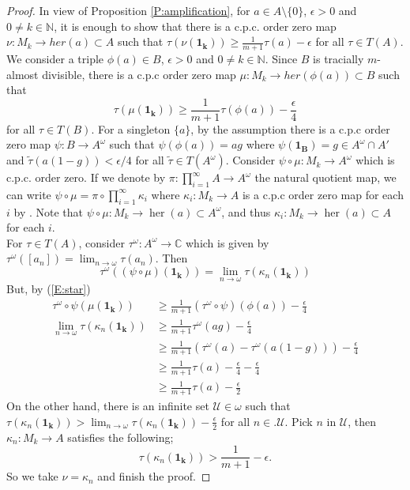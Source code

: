 \documentclass[12pt]{amsart}
\theoremstyle{plain}
\theoremstyle{definition}
\def\her{\operatorname{her}}
\newcommand{\mc}{\mathcal}
\numberwithin{equation}{section}
\begin{document}
\begin{proof}
In view of Proposition \ref{P:amplification}, for $a \in A\setminus \{0\}$, $\epsilon >0$ and $0\neq k \in \mathbb{N}$, it is enough to show that there is a c.p.c. order zero map $\nu:M_k \to her(a) \subset A$ such that $\tau(\nu(\mathbf{1_k})) \ge \frac{1}{m+1} \tau(a) -\epsilon$ for all $\tau \in T(A)$. We consider a triple $\phi(a) \in B$, $\epsilon >0$ and $0\neq k \in \mathbb{N}$. Since $B$ is tracially $m$-almost divisible, there is a c.p.c order zero map $\mu: M_k \to her(\phi(a)) \subset B$ such that 
\begin{equation}\label{E:star}
\tau(\mu(\mathbf{1_k})) \ge \frac{1}{m+1} \tau(\phi(a)) -\frac{\epsilon}{4} 
\end{equation}
for all $\tau \in T(B)$. For a singleton $\{a \}$, by the assumption there is a c.p.c order zero map $\psi: B \to A^{\omega}$ such that $\psi (\phi (a))= ag$ where $\psi(\mathbf{1_B})=g \in A^{\omega}\cap A'$ and $\widetilde{\tau}(a(1-g)) < \epsilon/4$ for all $\widetilde{\tau} \in T(A^{\omega})$.  Consider $\psi\circ \mu : M_{k} \to A^{\omega}$ which is c.p.c. order zero. If we denote by $\pi: \prod_{i=1}^{\infty} A \to A^{\omega}$ the natural quotient map, we can write $\psi \circ \mu = \pi \circ \prod_{i=1}^{\infty} \kappa_i $ where $\kappa_i:M_k \to A$ is a c.p.c order zero map for each $i$ by \cite[Lemma 2.1]{TWW}. Note that $\psi \circ \mu: M_k \to \her(a) \subset A^{\omega}$, and thus $\kappa_i: M_k \to \her(a) \subset A$ for each $i$.  
\\
For $\tau \in T(A)$, consider $\tau^{\omega}: A^{\omega} \to \mathbb{C}$ which is given by $\tau^{\omega} ([a_n])=\lim_{n \to \omega} \tau(a_n)$. Then 
\[ \tau^{\omega}((\psi \circ \mu)(\mathbf{1_k}))= \lim_{n \to \omega} \tau (\kappa_n(\mathbf{1_k})) \]
But, by (\ref{E:star})
\[ 
\begin{split}
\tau^{\omega} \circ \psi (\mu(\mathbf{1_k}) ) &\ge \frac{1}{m+1} (\tau^{\omega} \circ \psi ) (\phi(a)) - \frac{\epsilon}{4} \\
\lim_{n \to \omega} \tau (\kappa_n (\mathbf{1_k})) &\ge \frac{1}{m+1} \tau^{\omega}(ag)- \frac{\epsilon}{4} \\
& \ge \frac{1}{m+1} (\tau^{\omega}(a) - \tau^{\omega}(a(1-g))) -\frac{\epsilon}{4} \\
& \ge \frac{1}{m+1} \tau(a) - \frac{\epsilon}{4} -\frac{\epsilon}{4}\\
& \ge \frac{1}{m+1} \tau (a) -\frac{\epsilon}{2}  
\end{split}
\]
On the other hand, there is an infinite set $\mc{U} \in \omega$  such that $ \displaystyle \tau(\kappa_n(\mathbf{1_k}) ) > \lim_{n \to \omega} \tau(\kappa_n(\mathbf{1_k})) - \frac{\epsilon}{2}$ for all $n \in. \mc{U}$.  Pick $n$ in $\mc{U}$, then $\kappa_n: M_k \to A$ satisfies the following;
\[ \tau(\kappa_n(\mathbf{1_k})) > \frac{1}{m+1} -\epsilon.\]  So we take $\nu=\kappa_n$ and finish the proof. 
\end{proof}
\end{document}
